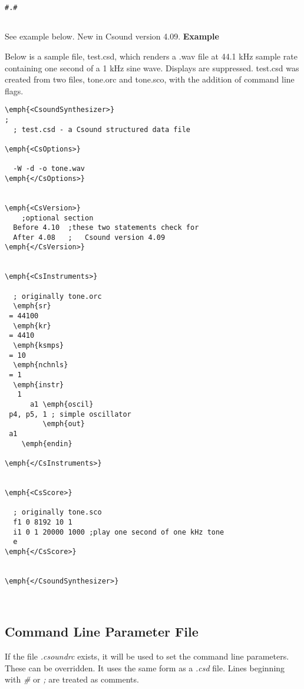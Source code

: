  
\begin{lstlisting}
#.#
            
\end{lstlisting}


 
 See example below. New in Csound version 4.09. \textbf{Example}


  Below is a sample file, test.csd, which renders a .wav file at 44.1 kHz sample rate containing one second of a 1 kHz sine wave. Displays are suppressed. test.csd was created from two files, tone.orc and tone.sco, with the addition of command line flags. 


 
\begin{lstlisting}
\emph{<CsoundSynthesizer>}
;
  ; test.csd - a Csound structured data file
  
\emph{<CsOptions>}

  -W -d -o tone.wav 
\emph{</CsOptions>}

  
\emph{<CsVersion>}
    ;optional section
  Before 4.10  ;these two statements check for
  After 4.08   ;   Csound version 4.09
\emph{</CsVersion>}

  
\emph{<CsInstruments>}

  ; originally tone.orc 
  \emph{sr}
 = 44100
  \emph{kr}
 = 4410
  \emph{ksmps}
 = 10
  \emph{nchnls}
 = 1
  \emph{instr}
   1 
      a1 \emph{oscil}
 p4, p5, 1 ; simple oscillator 
         \emph{out}
 a1
    \emph{endin}

\emph{</CsInstruments>}


\emph{<CsScore>}

  ; originally tone.sco
  f1 0 8192 10 1
  i1 0 1 20000 1000 ;play one second of one kHz tone
  e
\emph{</CsScore>}


\emph{</CsoundSynthesizer>}

            
\end{lstlisting}


 
\subsection*{Command Line Parameter File}


  If the file \emph{.csoundrc}
 exists, it will be used to set the command line parameters. These can be overridden. It uses the same form as a \emph{.csd}
 file. Lines beginning with \emph{\#}
 or \emph{;}
 are treated as comments. 


\begin{comment}
\begin{tabular}{lcr}
Previous &Home &Next \\
Command-line Flags &Up &Score File Preprocessing

\end{tabular}



\end{comment}

